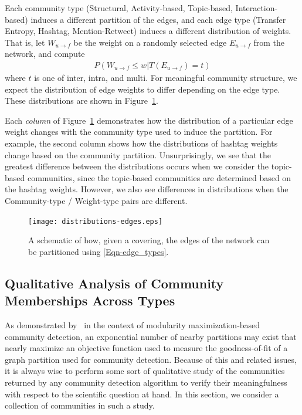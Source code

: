 Each community type (Structural, Activity-based, Topic-based, Interaction-based) induces a different partition of the edges, and each edge type (Transfer Entropy, Hashtag, Mention-Retweet) induces a different distribution of weights. That is, let $W_{u \to f}$ be the weight on a randomly selected edge $E_{u \to f}$ from the network, and compute
\begin{align}
	P(W_{u \to f} \leq w | T(E_{u \to f}) = t)
\end{align}
where $t$ is one of inter, intra, and multi. For meaningful community structure, we expect the distribution of edge weights to differ depending on the edge type.
These distributions are shown in Figure~\ref{Fig-distributions_by_types}. 

Each \emph{column} of Figure~\ref{Fig-distributions_by_types} demonstrates how the distribution of a particular edge weight changes with the community type used to induce the partition. For example, the second column shows how the distributions of hashtag weights change based on the community partition. Unsurprisingly, we see that the greatest difference between the distributions occurs when we consider the topic-based communities, since the topic-based communities are determined based on the hashtag weights. However, we also see differences in distributions when the Community-type / Weight-type pairs are different. 


\begin{figure}[!h]
	\centering
	\texttt{[image: distributions-edges.eps]}
	\caption{A schematic of how, given a covering, the edges of the network can be partitioned using \ref{Eqn-edge_types}.}
	\label{Fig-distributions_by_types}
\end{figure}

\subsection{Qualitative Analysis of Community Memberships Across Types}

As demonstrated by~\cite{good2010performance} in the context of modularity maximization-based community detection, an exponential number of nearby partitions may exist that nearly maximize an objective function used to measure the goodness-of-fit of a graph partition used for community detection. Because of this and related issues, it is always wise to perform some sort of qualitative study of the communities returned by any  community detection algorithm to verify their meaningfulness with respect to the scientific question at hand. In this section, we consider a collection of communities in such a study. 

